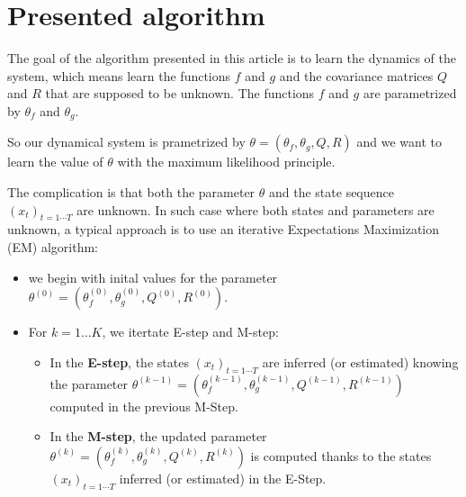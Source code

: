
\section{Presented algorithm}

The goal of the algorithm presented in this article is to learn the dynamics of the system, which means learn the functions $f$ and $g$  and the covariance matrices $Q$ and $R$ that are supposed to be unknown.
The functions $f$ and $g$ are parametrized by $\theta_f$ and $\theta_g$.

So our dynamical system is prametrized by $\theta = \left(\theta_f, \theta_g, Q, R \right)$ and we want to learn the value of $\theta$ with the maximum likelihood principle.

The complication is that both the parameter $\theta$ and the state sequence $(x_t)_{t=1 \cdots T}$ are unknown.
In such case where both states and parameters are unknown, a typical approach is to use an iterative Expectations Maximization (EM) algorithm:
\begin{itemize}
  \item we begin with inital values for the parameter $\theta^{(0)} = \left( \theta_f^{(0)}, \theta_g^{(0)}, Q^{(0)}, R^{(0)} \right)$.
\item For $k=1 \ldots K$, we itertate E-step and M-step:
  \begin{itemize}
    \item In the \textbf{E-step}, the states $(x_t)_{t=1 \cdots T}$ are inferred (or estimated) knowing the parameter $\theta^{(k-1)} = \left( \theta_f^{(k-1)}, \theta_g^{(k-1)}, Q^{(k-1)}, R^{(k-1)} \right)$ computed in the previous M-Step.
    \item In the \textbf{M-step}, the updated parameter $\theta^{(k)} = \left( \theta_f^{(k)}, \theta_g^{(k)}, Q^{(k)}, R^{(k)} \right)$ is computed thanks to the states $(x_t)_{t=1 \cdots T}$ inferred (or estimated) in the E-Step.
  \end{itemize}
\end{itemize}
